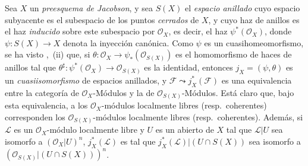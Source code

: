 \begin{env}[10.9.1]
\label{IV.10.9.1}
Sea $X$ un \emph{preesquema de Jacobson}, y sea $S(X)$ el \emph{espacio anillado} cuyo espacio subyacente es el subespacio de los puntos \emph{cerrados} de $X$, y cuyo haz de anillos es el haz \emph{inducido} sobre este subespacio por $\mathcal O_X$, es decir, el haz $\psi^*(\mathcal O_X)$, donde $\psi:S(X)\to X$ denota la inyección canónica.
Como $\psi$ es un
cuasihomeomorfismo, se ha visto ,~(ii) que, si $\theta:\mathcal O_X\to\psi_*(\mathcal O_{S(X)})$ es el homomorfismo de haces de anillos tal que $\theta^\sharp:\psi^*(\mathcal O_X)\to\mathcal O_{S(X)}$ es la identidad, entonces $j_X=(\psi,\theta)$ es un \emph{cuasiisomorfismo} de espacios anillados, y $\mathcal F\leadsto j_X^*(\mathcal F)$ es una equivalencia entre la categoría de $\mathcal O_X$-Módulos y la de $\mathcal O_{S(X)}$-Módulos.
Está claro que, bajo esta equivalencia, a los $\mathcal O_X$-módulos localmente libres (resp.\ coherentes) corresponden los $\mathcal O_{S(X)}$-módulos localmente libres (resp.\ coherentes). Además, si $\mathcal L$ es un $\mathcal O_X$-módulo localmente libre y $U$ es un abierto de $X$ tal que $\mathcal L|U$ sea isomorfo a $(\mathcal O_X|U)^n$, $j_X^*(\mathcal L)$ es tal que
$j_X^*(\mathcal L)|(U\cap S(X))$ sea isomorfo a
$(\mathcal O_{S(X)}|(U\cap S(X)))^n$.
\end{env}

